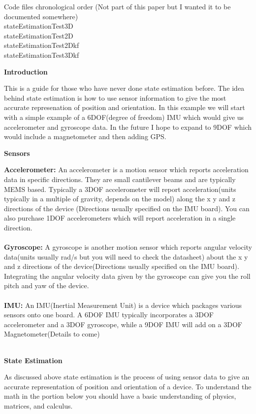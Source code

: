 \documentclass[12pt,letterpaper,boxed]{hmcpset}
\begin{document}
Code files chronological order (Not part of this paper but I wanted it to be documented somewhere)\\
stateEstimationTest3D\\
stateEstimationTest2D\\
stateEstimationTest2Dkf\\
stateEstimationTest3Dkf
\begin{center}
\textbf{Introduction}
\end{center}
This is a guide for those who have never done state estimation before. The idea behind state estimation is how to use sensor information to give the most accurate represenation of position and orientation. In this example we will start with a simple example of a 6DOF(degree of freedom) IMU which would give us accelerometer and gyroscope data. In the future I hope to expand to 9DOF which would include a magnetometer and then adding GPS.
\begin{center}
\textbf{Sensors}
\end{center}
\textbf{Accelerometer:} An accelerometer is a motion sensor which reports acceleration data in specific directions. They are small cantilever beams and are typically MEMS based. Typically a 3DOF accelerometer will report acceleration(units typically in a multiple of gravity, depends on the model) along the x y and z directions of the device (Directions usually specified on the IMU board). You can also purchase 1DOF accelerometers which will report acceleration in a single direction.\\\\
\textbf{Gyroscope:} A gyroscope is another motion sensor which reports angular velocity data(units usually rad/s but you will need to check the datasheet) about the x y and z directions of the device(Directions usually specified on the IMU board). Integrating the angular velocity data given by the gyroscope can give you the roll pitch and yaw of the device.\\\\
\textbf{IMU:} An IMU(Inertial Measurement Unit) is a device which packages various sensors onto one board. A 6DOF IMU typically incorporates a 3DOF accelerometer and a 3DOF gyroscope, while a 9DOF IMU will add on a 3DOF Magnetometer(Details to come)\\\\
\begin{center}
\textbf{State Estimation}
\end{center}
As discussed above state estimation is the process of using sensor data to give an accurate representation of position and orientation of a device. To understand the math in the portion below you should have a basic understanding of physics, matrices, and calculus.\\
\end{document}
